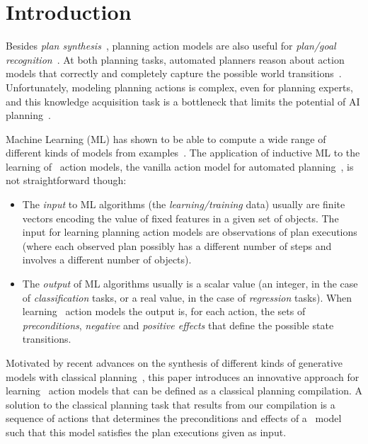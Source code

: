 
\section{Introduction}
\label{sec:introduction}

Besides {\em plan synthesis}~\cite{ghallab2004automated}, planning action models are also useful for {\em plan/goal recognition}~\cite{ramirez2012plan}. At both planning tasks, automated planners reason about action models that correctly and completely capture the possible world transitions~\cite{geffner:book:2013}. Unfortunately, modeling planning actions is complex, even for planning experts, and this knowledge acquisition task is a bottleneck that limits the potential of AI planning~\cite{kambhampati:modellite:AAAI2007}.

Machine Learning (ML) has shown to be able to compute a wide range of different kinds of models from examples~\cite{michalski2013machine}. The application of inductive ML to the learning of \strips\ action models, the vanilla action model for automated planning~\cite{fikes1971strips}, is not straightforward though:
\begin{itemize}
\item The {\em input} to ML algorithms (the {\em learning/training} data) usually are finite vectors encoding the value of fixed features in a given set of objects. The input for learning planning action models are observations of plan executions (where each observed plan possibly has a different number of steps and involves a different number of objects).
\item The {\em output} of ML algorithms usually is a scalar value (an integer, in the case of {\em classification} tasks, or a real value, in the case of {\em regression} tasks). When learning \strips\ action models the output is, for each action, the sets of {\em preconditions}, {\em negative} and {\em positive effects} that define the possible state transitions.
\end{itemize}

Motivated by recent advances on the synthesis of different kinds of generative models with classical planning~\cite{bonet2009automatic,segovia2016generalized,segovia2016hierarchical,segovia2017generating}, this paper introduces an innovative approach for learning \strips\ action models that can be defined as a classical planning compilation. A solution to the classical planning task that results from our compilation is a sequence of actions that determines the preconditions and effects of a \strips\ model such that this model satisfies the plan executions given as input.

